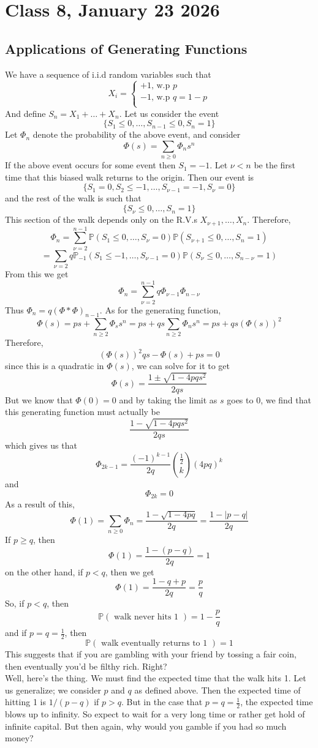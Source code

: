 \documentclass{article}
\begin{document}
\section*{Class 8, January 23 2026}
\subsection*{Applications of Generating Functions}
We have a sequence of i.i.d random variables such that 
$$X_i=
\begin{cases}
+1\text{, w.p } p\\
-1\text{, w.p } q=1-p\\
\end{cases}$$
And define $S_n=X_1+\dots+X_n$. Let us consider the event $$\{S_1\leq 0,\dots, S_{n-1}\leq 0,S_n=1\}$$
Let $\Phi_n$ denote the probability of the above event, and consider
$$\Phi(s)=\sum_{n\geq 0}\Phi_n s^n$$
If the above event occurs for some event then $S_1=-1$. Let $\nu<n$ be the first time that this biased walk returns to the origin. 
Then our event is 
$$\{S_1=0,S_2\leq -1,\dots,S_{\nu -1}=-1,S_{\nu}=0\}$$
and the rest of the walk is such that 
$$\{S_{\nu}\leq 0,\dots,S_n=1\}$$
This section of the walk depends only on the R.V.s $X_{\nu+1},\dots,X_n$. 
Therefore,
$$\Phi_n=\sum_{\nu=2}^{n-1}\mathbb{P}(S_1\leq 0,\dots,S_{\nu}=0)\mathbb{P}(S_{\nu +1}\leq 0,\dots,S_n=1)$$
$$=\sum_{\nu=2}q\mathbb{P}_{-1}(S_1\leq -1,\dots,S_{\nu-1}=0)\mathbb{P}(S_{\nu}\leq 0,\dots, S_{n-\nu}=1)$$
From this we get 
$$\Phi_n=\sum_{\nu=2}^{n-1}q\Phi_{\nu -1}\Phi_{n-\nu}$$
Thus $\Phi_n=q(\Phi*\Phi)_{n-1}$. As for the generating function,
$$\Phi(s)=ps+\sum_{n\geq2}\Phi_s s^n=ps+qs\sum_{n\geq 2}\Phi_{n}s^n=ps+qs(\Phi(s))^2$$
Therefore, 
$$(\Phi(s))^2 qs-\Phi(s)+ps=0$$
since this is a quadratic in $\Phi(s)$, we can solve for it to get
$$\Phi(s)=\frac{1\pm \sqrt{1-4pqs^2}}{2qs}$$
But we know that $\Phi(0)=0$ and by taking the limit as $s$ goes to 0, we find that this generating function must actually be 
$$\frac{1-\sqrt{1-4pqs^2}}{2qs}$$
which gives us that 
$$\Phi_{2k-1}=\frac{(-1)^{k-1}}{2q}\binom{\frac{1}{2}}{k}(4pq)^k$$
 and $$\Phi_{2k}=0$$
As a result of this, 
$$\Phi(1)=\sum_{n\geq 0}\Phi_{n}=\frac{1-\sqrt{1-4pq}}{2q}=\frac{1-|p-q|}{2q}$$
If $p\geq q$, then $$\Phi(1)=\frac{1-(p-q)}{2q}=1$$
on the other hand, if $p<q$, then we get 
$$\Phi(1)=\frac{1-q+p}{2q}=\frac{p}{q}$$
So, if $p<q$, then 
$$\mathbb{P}(\text{ walk never hits 1 })=1-\frac{p}{q}$$
and if $p=q=\frac{1}{2}$, then $$\mathbb{P}(\text{ walk eventually returns to 1 })=1$$
This suggests that if you are gambling with your friend by tossing a fair coin, then eventually you'd be filthy rich. Right?\\
Well, here's the thing. We must find the expected time that the walk hits 1. Let us generalize; we consider $p$ and $q$ as defined above. Then the expected time of hitting 1 is $1/(p-q)$ if $p>q$. But in the case that $p=q=\frac{1}{2}$, the expected time blows up to infinity. So expect to wait for a very long time or rather get hold of infinite capital. But then again, why would you gamble if you had so much money?
\end{document}
